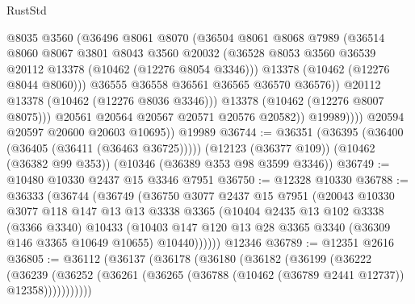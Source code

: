 \begin{lexlean}{RustStd}
\begin{coremodule}
                        @8035
                        @3560
                        (@36496
                          @8061
                          @8070
                          (@36504
                            @8061
                            @8068
                            @7989
                            (@36514
                              @8060
                              @8067
                              @3801
                              @8043
                              @3560
                              @20032
                              (@36528
                                @8053
                                @3560
                                @36539
                                @20112
                                @13378
                                (@10462 (@12276 @8054 @3346)))
                              @13378
                              (@10462 (@12276 @8044 @8060)))
                            @36555
                            @36558
                            @36561
                            @36565
                            @36570
                            @36576))
                        @20112
                        @13378
                        (@10462 (@12276 @8036 @3346)))
                      @13378
                      (@10462 (@12276 @8007 @8075)))
                    @20561
                    @20564
                    @20567
                    @20571
                    @20576
                    @20582))
                @19989))))
        @20594
        @20597
        @20600
        @20603
        @10695))
    @19989
@36744 := @36351
    (@36395 (@36400 (@36405 (@36411 (@36463 @36725)))))
    (@12123 (@36377 @109))
    (@10462 (@36382 @99 @353))
    (@10346 (@36389 @353 @98 @3599 @3346))
@36749 := @10480 @10330 @2437 @15 @3346 @7951
@36750 := @12328 @10330
@36788 := @36333
    (@36744
      (@36749
        (@36750
          @3077
          @2437
          @15
          @7951
          (@20043
            @10330
            @3077
            @118
            @147
            @13
            @13
            @3338
            @3365
            (@10404
              @2435
              @13
              @102
              @3338
              (@3366 @3340)
              @10433
              (@10403 @147 @120 @13 @28 @3365 @3340 (@36309 @146 @3365 @10649 @10655) @10440))))))
    @12346
@36789 := @12351 @2616
@36805 := @36112
    (@36137
      (@36178
        (@36180
          (@36182
            (@36199
              (@36222
                (@36239
                  (@36252 (@36261 (@36265 (@36788 (@10462 (@36789 @2441 @12737)) @12358)))))))))))

\end{coremodule}
\end{lexlean}
